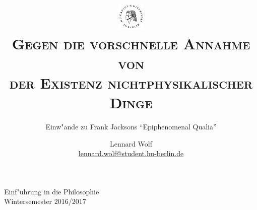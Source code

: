 \documentclass[a4paper, emulatestandardclasses, 12pt]{scrartcl}
\date{\vspace{-3ex}}
\begin{document}
\title{%
	\includegraphics*[width=0.1\textwidth]{images/hu_logo2.png}\\
	\vspace{50pt}
	\scshape\LARGE{Gegen die vorschnelle Annahme von\\der Existenz nichtphysikalischer Dinge}}
	
	\subtitle{Einw"ande zu Frank Jacksons "`Epiphenomenal Qualia"'}
\author{Lennard Wolf\\
        \small{\href{mailto:lennard.wolf@student.hu-berlin.de}{lennard.wolf@student.hu-berlin.de}}}      

\maketitle

\vspace{\fill}

\begin{minipage}[b]{\textwidth}
    \centering
    \onehalfspacing
    \large   
    Einf"uhrung in die Philosophie\\
    Wintersemester 2016/2017

    \vspace{-20mm} 
\end{minipage}%
\thispagestyle{empty}
\newpage
\clearpage
\setcounter{page}{1}
\end{document}
